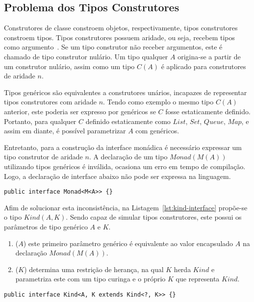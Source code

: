 \documentclass[10pt, conference]{IEEEtran}
\begin{document}
\subsection{Problema dos Tipos Construtores}

Construtores de classe constroem objetos, respectivamente, tipos construtores constroem tipos. Tipos construtores possuem aridade, ou seja, recebem tipos como argumento~\cite{pierce2002types}. Se um tipo construtor não receber argumentos, este é chamado de tipo construtor nulário. Um tipo qualquer $A$ origina-se a partir de um construtor nulário, assim como um tipo $C(A)$ é aplicado para construtores de aridade $n$.

Tipos genéricos são equivalentes a construtores unários, incapazes de representar tipos construtores com aridade $n$. Tendo como exemplo o mesmo tipo $C(A)$ anterior, este poderia ser expresso por genéricos se $C$ fosse estaticamente definido. Portanto, para qualquer $C$ definido estaticamente como $List$, $Set$, $Queue$, $Map$, e assim em diante, é possível parametrizar $A$ com genéricos.

Entretanto, para a construção da interface monádica é necessário expressar um tipo construtor de aridade $n$. A declaração de um tipo $Monad(M(A))$ utilizando tipos genéricos é inválida, ocasiona um erro em tempo de compilação. Logo, a declaração de interface abaixo não pode ser expressa na linguagem.

\begin{lstlisting}[caption={Interface Monad inválida}, label={lst:invalid-generic-monad}]
public interface Monad<M<A>> {}
\end{lstlisting}

Afim de solucionar esta inconsistência, na Listagem~\ref{lst:kind-interface} propõe-se o tipo $Kind(A, K)$. Sendo capaz de simular tipos construtores, este possui os parâmetros de tipo genérico $A$ e $K$.

\begin{enumerate}[label=(\alph*), leftmargin=3em, topsep = 0pt, itemsep = 1ex, partopsep = 1ex, parsep = 1ex]
	\item ($A$) este primeiro parâmetro genérico é equivalente ao valor encapsulado $A$ na declaração ${Monad(M(A))}$.
	\item ($K$) determina uma restrição de herança, na qual $K$ herda $Kind$ e parametriza este com um tipo curinga e o próprio $K$ que representa $Kind$.
\end{enumerate}

\begin{lstlisting}[caption={Interface Kind}, label={lst:kind-interface}]
public interface Kind<A, K extends Kind<?, K>> {}
\end{lstlisting}
\end{document}
